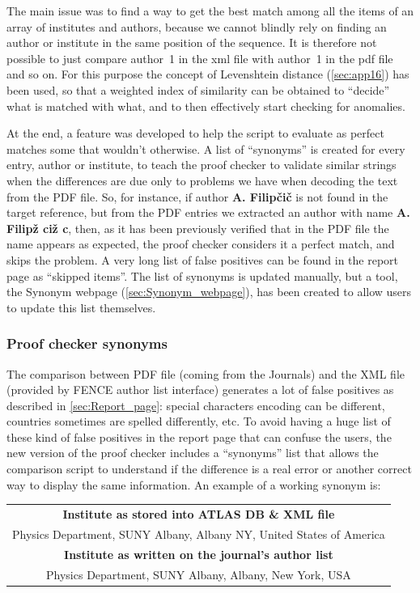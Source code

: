 The main issue was to find a way to get the best match among all the items of an array of institutes and authors,
because we cannot blindly rely on finding an author or institute in the same position of the sequence.
It is therefore not possible to just compare author~1 in the xml file with author~1 in the pdf file and so on.
For this purpose the concept of Levenshtein distance (\cref{sec:app16}) has been used,
so that a weighted index of similarity can be obtained to \enquote{decide} what is matched with what, and to then effectively start checking for anomalies.

At the end, a feature was developed to help the script to evaluate as perfect matches some that wouldn’t otherwise.
A list of \enquote{synonyms} is created for every entry, author or institute,
to teach the proof checker to validate similar strings when the differences are due only to problems we have when decoding the text from the PDF file.
So, for instance, if author \textbf{A. Filipčič} is not found in the target reference,
but from the PDF entries we extracted an author with name \textbf{A. Filipž ciž c}, then,
as it has been previously verified that in the PDF file the name appears as expected, the proof checker considers it a perfect match, and skips the problem.
A very long list of false positives can be found in the report page as \enquote{skipped items}.
The list of synonyms is updated manually, but a tool, the Synonym webpage (\cref{sec:Synonym_webpage}), has been created to allow users to update this list themselves.


\subsubsection{Proof checker synonyms}%
\label{sec:Proof_checker_synonyms}

The comparison between PDF file (coming from the Journals) and the XML file (provided by FENCE author list interface) generates a lot of false positives as described in \cref{sec:Report_page}:
special characters encoding can be different, countries sometimes are spelled differently, etc.
To avoid having a huge list of these kind of false positives in the report page that can confuse the users, the new version of the proof checker includes a \enquote{synonyms} list that allows the comparison script to understand if the difference is a real error or another correct way to display the same information. 
An example of a working synonym is:
\begin{table}[htb]
  \centering
  \begin{tabular}{c}
  \textbf{Institute as stored into ATLAS DB \& XML file} \\
  Physics Department, SUNY Albany, Albany NY, United States of America \\
  \midrule
  \textbf{Institute as written on the journal’s author list} \\
  Physics Department, SUNY Albany, Albany, New York, USA
  \end{tabular}
\end{table}

